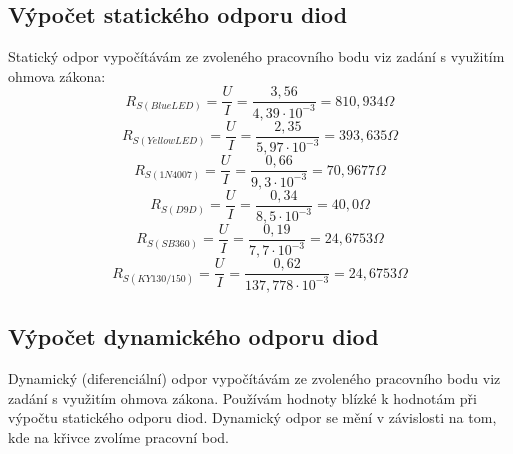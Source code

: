 \documentclass[12pt]{article} %
\begin{document}
\subsection*{Výpočet statického odporu diod}
Statický odpor vypočítávám ze zvoleného pracovního bodu viz zadání s využitím ohmova zákona:
\begin{equation}
R_{S(BlueLED)}=\frac{U}{I}=\frac{3,56}{4,39\cdot 10^{-3}}=810,934\Omega
\end{equation}
\begin{equation}
R_{S(YellowLED)}=\frac{U}{I}=\frac{2,35}{5,97\cdot 10^{-3}}=393,635\Omega
\end{equation}
\begin{equation}
R_{S(1N4007)}=\frac{U}{I}=\frac{0,66}{9,3\cdot 10^{-3}}=70,9677\Omega
\end{equation}
\begin{equation}
R_{S(D9D)}=\frac{U}{I}=\frac{0,34}{8,5\cdot 10^{-3}}=40,0\Omega
\end{equation}
\begin{equation}
R_{S(SB 360)}=\frac{U}{I}=\frac{0,19}{7,7\cdot 10^{-3}}=24,6753\Omega
\end{equation}
\begin{equation}
R_{S(KY 130/150)}=\frac{U}{I}=\frac{0,62}{137,778\cdot 10^{-3}}=24,6753\Omega
\end{equation}

\subsection*{Výpočet dynamického odporu diod}
Dynamický (diferenciální) odpor vypočítávám ze zvoleného pracovního bodu viz zadání s využitím ohmova zákona. Používám hodnoty blízké k hodnotám při výpočtu statického odporu diod. Dynamický odpor se mění v závislosti na tom, kde na křivce zvolíme pracovní bod.
\end{document}
